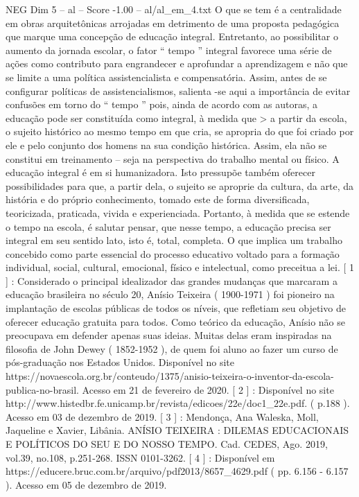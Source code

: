 \begin{textsample}{NEG Dim 5 – al – Score -1.00 – al/al\_em\_4.txt}
O que se tem é a centralidade em obras arquitetônicas arrojadas em detrimento de uma proposta pedagógica que marque uma concepção de educação integral.
Entretanto, ao possibilitar o aumento da jornada escolar, o fator “ tempo ” integral favorece uma série de ações como contributo para engrandecer e aprofundar a aprendizagem e não que se limite a uma política assistencialista e compensatória.
Assim, antes de se configurar políticas de assistencialismos, salienta -se aqui a importância de evitar confusões em torno do “ tempo ” pois, ainda de acordo com as autoras, a educação pode ser constituída como integral, à medida que > a partir da escola, o sujeito histórico ao mesmo tempo em que cria, se apropria do que foi criado por ele e pelo conjunto dos homens na sua condição histórica.
Assim, ela não se constitui em treinamento – seja na perspectiva do trabalho mental ou físico.
A educação integral é em si humanizadora.
Isto pressupõe também oferecer possibilidades para que, a partir dela, o sujeito se aproprie da cultura, da arte, da história e do próprio conhecimento, tomado este de forma diversificada, teoricizada, praticada, vivida e experienciada.
Portanto, à medida que se estende o tempo na escola, é salutar pensar, que nesse tempo, a educação precisa ser integral em seu sentido lato, isto é, total, completa.
O que implica um trabalho concebido como parte essencial do processo educativo voltado para a formação individual, social, cultural, emocional, físico e intelectual, como preceitua a lei. [ 1 ] : Considerado o principal idealizador das grandes mudanças que marcaram a educação brasileira no século 20, Anísio Teixeira ( 1900-1971 ) foi pioneiro na implantação de escolas públicas de todos os níveis, que refletiam seu objetivo de oferecer educação gratuita para todos.
Como teórico da educação, Anísio não se preocupava em defender apenas suas ideias.
Muitas delas eram inspiradas na filosofia de John Dewey ( 1852-1952 ), de quem foi aluno ao fazer um curso de pós-graduação nos Estados Unidos.
Disponível no site https://novaescola.org.br/conteudo/1375/anisio-teixeira-o-inventor-da-escola-publica-no-brasil.
Acesso em 21 de fevereiro de 2020. [ 2 ] : Disponível no site http://www.histedbr.fe.unicamp.br/revista/edicoes/22e/doc1\_22e.pdf. ( p.188 ).
Acesso em 03 de dezembro de 2019. [ 3 ] : Mendonça, Ana Waleska, Moll, Jaqueline e Xavier, Libânia.
ANÍSIO TEIXEIRA : DILEMAS EDUCACIONAIS E POLÍTICOS DO SEU E DO NOSSO TEMPO.
Cad.
CEDES, Ago. 2019, vol.39, no.108, p.251-268.
ISSN 0101-3262. [ 4 ] : Disponível em https://educere.bruc.com.br/arquivo/pdf2013/8657\_4629.pdf ( pp. 6.156 - 6.157 ).
Acesso em 05 de dezembro de 2019.

\end{textsample}
